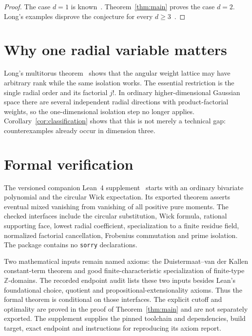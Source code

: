 \documentclass[11pt]{article}
\begin{document}
\begin{proof}
The case \(d=1\) is known~\cite[Proposition~4.2]{DVZ}.
Theorem~\ref{thm:main} proves the case \(d=2\).
Long's examples disprove the conjecture for every \(d\geq3\)~\cite{Long}.
\end{proof}

\section{Why one radial variable matters}

Long's multitorus theorem~\cite{LongTorus} shows that the angular weight
lattice may have arbitrary rank while the same isolation works.  The
essential restriction is the single radial order and its factorial \(j!\).
In ordinary higher-dimensional Gaussian space there are several
independent radial directions with product-factorial weights, so the
one-dimensional isolation step no longer applies.
Corollary~\ref{cor:classification} shows that this is not merely a
technical gap: counterexamples already occur in dimension three.

\section{Formal verification}

The versioned companion Lean~4 supplement~\cite{FormalGMC2} starts
with an ordinary bivariate polynomial and the circular Wick expectation.
Its exported theorem asserts eventual mixed vanishing from vanishing of
all positive pure moments.  The checked interfaces include the circular
substitution, Wick formula, rational supporting face, lowest radial
coefficient, specialization to a finite residue field, normalized factorial
cancellation, Frobenius commutation and prime isolation.  The package
contains no \texttt{sorry} declarations.

Two mathematical inputs remain named axioms: the Duistermaat--van der
Kallen constant-term theorem and good finite-characteristic specialization
of finite-type $\mathbb Z$-domains.  The recorded endpoint audit lists
these two inputs besides Lean's foundational choice, quotient and
propositional-extensionality axioms.  Thus the formal theorem is conditional
on those interfaces.  The explicit cutoff and optimality are proved in
the proof of Theorem~\ref{thm:main} and are not separately exported.  The supplement supplies the
pinned toolchain and dependencies, build target, exact endpoint and
instructions for reproducing its axiom report.
\end{document}
